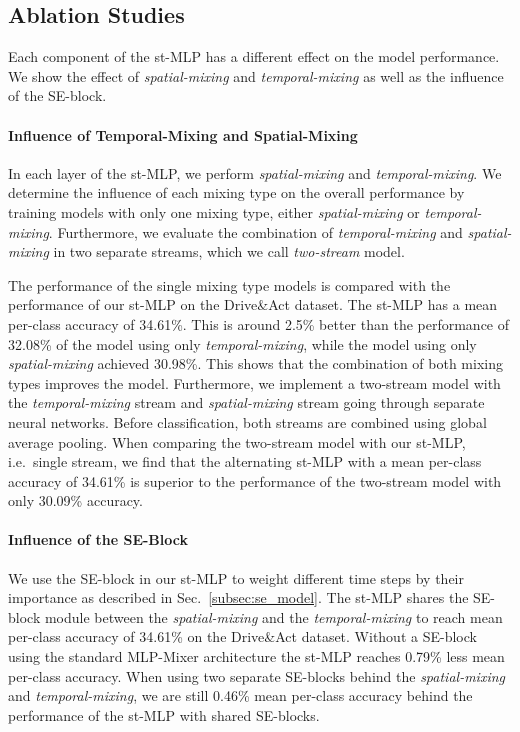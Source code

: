 \documentclass[letterpaper, 10 pt, conference]{ieeeconf}
\begin{document}
\subsection{Ablation Studies}
\label{subsec:ablation_studies}
Each component of the st-MLP has a different effect on the model performance. We show the effect of \textit{spatial-mixing} and \textit{temporal-mixing} as well as the influence of the SE-block.

\paragraph{Influence of Temporal-Mixing and Spatial-Mixing}
In each layer of the st-MLP, we perform \textit{spatial-mixing} and \textit{temporal-mixing}. We determine the influence of each mixing type on the overall performance by training models with only one mixing type, either \textit{spatial-mixing} or \textit{temporal-mixing}. Furthermore, we evaluate the combination of \textit{temporal-mixing} and \textit{spatial-mixing} in two separate streams, which we call \textit{two-stream} model.

The performance of the single mixing type models is compared with the performance of our st-MLP on the Drive\&Act dataset. The st-MLP has a mean per-class accuracy of 34.61\%. This is around 2.5\% better than the performance of 32.08\% of the model using only \textit{temporal-mixing}, while the model using only \textit{spatial-mixing} achieved 30.98\%. This shows that the combination of both mixing types improves the model. Furthermore, we implement a two-stream model with the \textit{temporal-mixing} stream and \textit{spatial-mixing} stream going through separate neural networks. Before classification, both streams are combined using global average pooling. When comparing the two-stream model with our st-MLP, i.e.~single stream, we find that the alternating st-MLP with a mean per-class accuracy of 34.61\% is superior to the performance of the two-stream model with only 30.09\% accuracy.


\paragraph{Influence of the SE-Block}
\label{para:eval_se_block}

We use the SE-block in our st-MLP to weight different time steps by their importance as described in Sec.~\ref{subsec:se_model}. The st-MLP shares the SE-block module between the \textit{spatial-mixing} and the \textit{temporal-mixing} to reach mean per-class accuracy of 34.61\% on the Drive\&Act dataset. Without a SE-block using the standard MLP-Mixer architecture the st-MLP reaches 0.79\% less mean per-class accuracy. When using two separate SE-blocks behind the \textit{spatial-mixing} and \textit{temporal-mixing}, we are still 0.46\% mean per-class accuracy behind the performance of the st-MLP with shared SE-blocks. 
\end{document}
